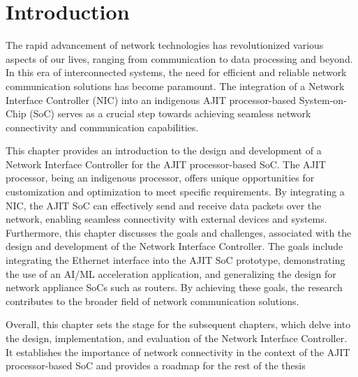 \documentclass[a4paper,11pt, final]{report}
\begin{document}
\tableofcontents
  \listoffigures
  \listoftables

  
  

\chapter{Introduction}

The rapid advancement of network technologies has revolutionized various aspects of our lives, ranging from communication to data processing and beyond. In this era of interconnected systems, the need for efficient and reliable network communication solutions has become paramount. The integration of a Network Interface Controller (NIC) into an indigenous AJIT processor-based System-on-Chip (SoC) serves as a crucial step towards achieving seamless network connectivity and communication capabilities.

This chapter provides an introduction to the design and development of a Network Interface Controller for the AJIT processor-based SoC. The AJIT processor, being an indigenous processor, offers unique opportunities for customization and optimization to meet specific requirements. By integrating a NIC, the AJIT SoC can effectively send and receive data packets over the network, enabling seamless connectivity with external devices and systems. Furthermore, this chapter discusses the goals and challenges, associated with the design and development of the Network Interface Controller. The goals include integrating the Ethernet interface into the AJIT SoC prototype, demonstrating the use of an AI/ML acceleration application, and generalizing the design for network appliance SoCs such as routers. By achieving these goals, the research contributes to the broader field of network communication solutions. 

Overall, this chapter sets the stage for the subsequent chapters, which delve into the design, implementation, and evaluation of the Network Interface Controller. It establishes the importance of network connectivity in the context of the AJIT processor-based SoC and provides a roadmap for the rest of the thesis
\end{document}
